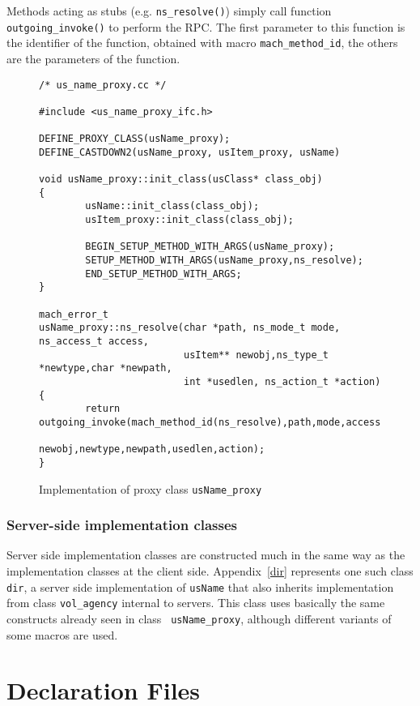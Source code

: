 Methods acting as stubs (e.g. {\tt ns\_resolve()})
simply call function {\tt outgoing\_invoke()} to perform the RPC.
The first parameter to this function is the identifier of
the function, obtained with macro {\tt mach\_method\_id}, the others
are the parameters of the function.

\begin{figure}[htbp]
{\footnotesize
\begin{verbatim}
/* us_name_proxy.cc */

#include <us_name_proxy_ifc.h>

DEFINE_PROXY_CLASS(usName_proxy);
DEFINE_CASTDOWN2(usName_proxy, usItem_proxy, usName)

void usName_proxy::init_class(usClass* class_obj)
{
        usName::init_class(class_obj);
        usItem_proxy::init_class(class_obj);

        BEGIN_SETUP_METHOD_WITH_ARGS(usName_proxy);
        SETUP_METHOD_WITH_ARGS(usName_proxy,ns_resolve);
        END_SETUP_METHOD_WITH_ARGS;
}

mach_error_t 
usName_proxy::ns_resolve(char *path, ns_mode_t mode, ns_access_t access, 
                         usItem** newobj,ns_type_t *newtype,char *newpath, 
                         int *usedlen, ns_action_t *action)
{
        return outgoing_invoke(mach_method_id(ns_resolve),path,mode,access,
                               newobj,newtype,newpath,usedlen,action);
}
\end{verbatim}
}
\caption{Implementation of proxy class {\tt usName\_proxy}}
\label{us_name_proxy}
\end{figure}

\subsubsection{Server-side implementation classes}

Server side implementation classes are constructed much in the same
way as the implementation classes at the client side.
Appendix~\ref{dir} represents one such class {\tt
dir}, a server side implementation of {\tt usName} that also inherits
implementation from class {\tt vol\_agency} internal to servers. This
class uses basically the same constructs already seen in class {\tt
usName\_proxy}, although different variants of some macros are used.

\section{Declaration Files}

